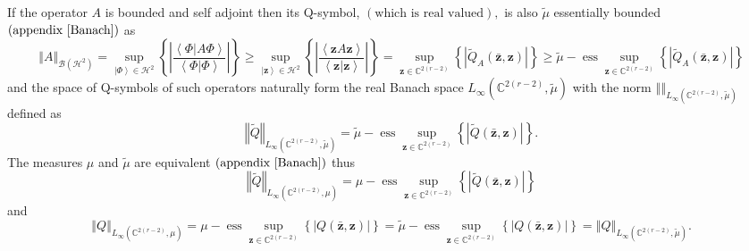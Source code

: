 \documentclass[aps,preprint]{revtex4}%
\begin{document}
If the operator $A$ is bounded and self adjoint then its Q-symbol, $\left(
\text{which is real valued}\right)  ,$ is also $\tilde{\mu}$ essentially
bounded $\left(  \text{appendix \ref{Banach}}\right)  $ as
\begin{equation}
\left\Vert A\right\Vert _{\mathcal{B}\left(  \mathcal{H}^{2}\right)  }%
=\sup_{\left\vert \Phi\right\rangle \in\mathcal{H}^{2}}\left\{  \left\vert
\frac{\left\langle \left.  \Phi\right\vert A\Phi\right\rangle }{\left\langle
\left.  \Phi\right\vert \Phi\right\rangle }\right\vert \right\}  \geq
\sup_{\left\vert \mathbf{z}\right\rangle \in\mathcal{H}^{2}}\left\{
\left\vert \frac{\left\langle \mathbf{z}A\mathbf{z}\right\rangle
}{\left\langle \left.  \mathbf{z}\right\vert \mathbf{z}\right\rangle
}\right\vert \right\}  =\sup_{\mathbf{z}\in\mathbb{C}^{2\left(  r-2\right)  }%
}\left\{  \left\vert \tilde{Q}_{A}\left(  \mathbf{\bar{z}},\mathbf{z}\right)
\right\vert \right\}  \geq\tilde{\mu}-\operatorname*{ess}\sup_{\mathbf{z}%
\in\mathbb{C}^{2\left(  r-2\right)  }}\left\{  \left\vert \tilde{Q}_{A}\left(
\mathbf{\bar{z}},\mathbf{z}\right)  \right\vert \right\}
\end{equation}
and the space of Q-symbols of such operators naturally form the real Banach
space $L_{\infty}\left(  \mathbb{C}^{2\left(  r-2\right)  },\tilde{\mu
}\right)  $ with the norm $\left\Vert {}\right\Vert _{L_{\infty}\left(
\mathbb{C}^{2\left(  r-2\right)  },\tilde{\mu}\right)  }$ defined as
\begin{equation}
\left\Vert \tilde{Q}\right\Vert _{L_{\infty}\left(  \mathbb{C}^{2\left(
r-2\right)  },\tilde{\mu}\right)  }=\tilde{\mu}-\operatorname*{ess}%
\sup_{\mathbf{z}\in\mathbb{C}^{2\left(  r-2\right)  }}\left\{  \left\vert
\tilde{Q}\left(  \mathbf{\bar{z}},\mathbf{z}\right)  \right\vert \right\}  .
\end{equation}
The measures $\mu$ and $\tilde{\mu}$ are equivalent $\left(  \text{appendix
\ref{Banach}}\right)  $ thus
\begin{equation}
\left\Vert \tilde{Q}\right\Vert _{L_{\infty}\left(  \mathbb{C}^{2\left(
r-2\right)  },\mu\right)  }=\mu-\operatorname*{ess}\sup_{\mathbf{z}%
\in\mathbb{C}^{2\left(  r-2\right)  }}\left\{  \left\vert \tilde{Q}\left(
\mathbf{\bar{z}},\mathbf{z}\right)  \right\vert \right\}
\end{equation}
and
\begin{equation}
\left\Vert Q\right\Vert _{L_{\infty}\left(  \mathbb{C}^{2\left(  r-2\right)
},\mu\right)  }=\mu-\operatorname*{ess}\sup_{\mathbf{z}\in\mathbb{C}^{2\left(
r-2\right)  }}\left\{  \left\vert Q\left(  \mathbf{\bar{z}},\mathbf{z}\right)
\right\vert \right\}  =\tilde{\mu}-\operatorname*{ess}\sup_{\mathbf{z}%
\in\mathbb{C}^{2\left(  r-2\right)  }}\left\{  \left\vert Q\left(
\mathbf{\bar{z}},\mathbf{z}\right)  \right\vert \right\}  =\left\Vert
Q\right\Vert _{L_{\infty}\left(  \mathbb{C}^{2\left(  r-2\right)  },\tilde
{\mu}\right)  }.
\end{equation}
\end{document}
